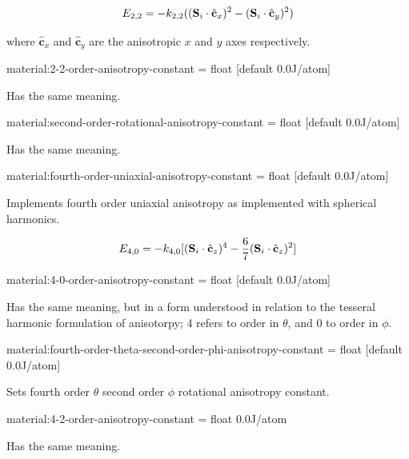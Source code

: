 \begin{equation*}
E_{2,2} = - k_{2,2} ( ( \mathbf{S}_i \cdot \hat{\mathbf{c}}_x )^2 - ( \mathbf{S}_i \cdot \hat{\mathbf{c}}_y )^2 )
\end{equation*}

\noindent where $\hat{\mathbf{c}}_x$ and $\hat{\mathbf{c}}_y$ are the anisotropic $x$ and $y$ axes respectively.

{\zicf material:2-2-order-anisotropy-constant = float [default 0.0\newline J/atom]} Has the same meaning.

{\zicf material:second-order-rotational-anisotropy-constant = float [default 0.0\newline J/atom]} Has the same meaning.

{\zicf material:fourth-order-uniaxial-anisotropy-constant = float [default 0.0\newline J/atom]} Implements fourth order uniaxial anisotropy as implemented with spherical harmonics.

\begin{equation*}
  E_{4,0} = - k_{4,0} [ ( \mathbf{S}_i \cdot \hat{\mathbf{c}}_z )^4 - \frac{6}{7} ( \mathbf{S}_i \cdot \hat{\mathbf{c}}_z )^2 ]
\end{equation*}

{\zicf material:4-0-order-anisotropy-constant = float [default 0.0\newline J/atom]} Has the same meaning, but in a form understood in relation to the tesseral harmonic formulation of anisotorpy; 4 refers to order in $\theta$, and 0 to order in $\phi$.

{\zicf material:fourth-order-theta-second-order-phi-anisotropy-constant = float [default 0.0\newline J/atom]} Sets fourth order $\theta$ second order $\phi$ rotational anisotropy constant.

{\zicf material:4-2-order-anisotropy-constant = float 0.0\newline J/atom} Has the same meaning.

